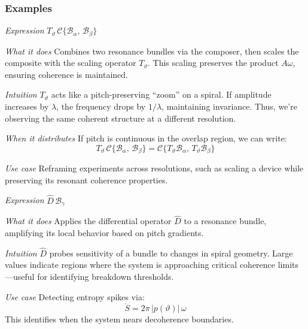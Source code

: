 \subsubsection{Examples}

\begin{styledexample}
  \item[\emph{Expression}] \( T_{\vartheta}\,\mathcal{C}\{\mathcal{B}_\alpha,\,\mathcal{B}_\beta\} \)

  \item[\emph{What it does}]
  Combines two resonance bundles via the composer, then scales the composite with the scaling operator \(T_{\vartheta}\). This scaling preserves the product \(A\omega\), ensuring coherence is maintained.

  \item[\emph{Intuition}]
  \(T_{\vartheta}\) acts like a pitch-preserving “zoom” on a spiral. If amplitude increases by \(\lambda\), the frequency drops by \(1/\lambda\), maintaining invariance. Thus, we're observing the same coherent structure at a different resolution.

  \item[\emph{When it distributes}]
  If pitch is continuous in the overlap region, we can write:
  \[
    T_{\vartheta}\,\mathcal{C}\{\mathcal{B}_\alpha,\,\mathcal{B}_\beta\}
    = \mathcal{C}\{T_{\vartheta}\mathcal{B}_\alpha,\,T_{\vartheta}\mathcal{B}_\beta\}
  \]

  \item[\emph{Use case}]
  Reframing experiments across resolutions, such as scaling a device while preserving its resonant coherence properties.
\end{styledexample}


\begin{styledexample}
  \item[\emph{Expression}] \( \hat D\,\mathcal{B}_\gamma \)

  \item[\emph{What it does}]
  Applies the differential operator \(\hat D\) to a resonance bundle, amplifying its local behavior based on pitch gradients.

  \item[\emph{Intuition}]
  \(\hat D\) probes sensitivity of a bundle to changes in spiral geometry. Large values indicate regions where the system is approaching critical coherence limits—useful for identifying breakdown thresholds.

  \item[\emph{Use case}]
  Detecting entropy spikes via:
  \[
    \dot S = 2\pi\,|p(\vartheta)|\,\omega
  \]
  This identifies when the system nears decoherence boundaries.
\end{styledexample}


